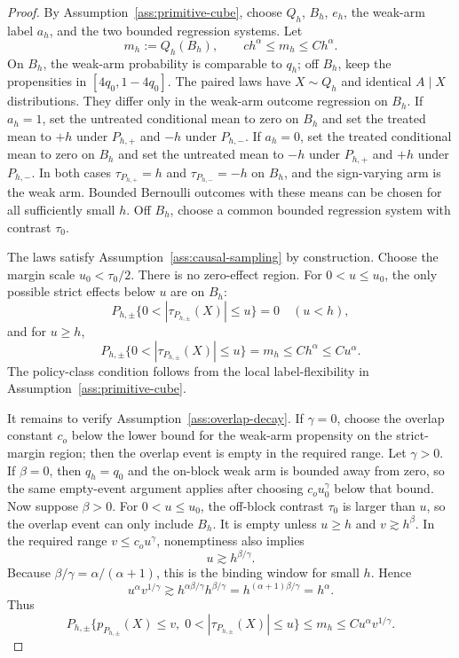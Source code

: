 \documentclass[11pt]{article}
\theoremstyle{definition}
\theoremstyle{plain}
\theoremstyle{remark}
\begin{document}
\begin{proof}
By Assumption~\ref{ass:primitive-cube}, choose \(Q_h\), \(B_h\),
\(e_h\), the weak-arm label \(a_h\), and the two bounded regression
systems.  Let
\[
m_h:=Q_h(B_h),\qquad c h^\alpha\le m_h\le C h^\alpha.
\]
On \(B_h\), the weak-arm probability is comparable to \(q_h\); off
\(B_h\), keep the propensities in \([4q_0,1-4q_0]\).  The paired laws have
\(X\sim Q_h\) and identical \(A\mid X\) distributions.  They differ only in
the weak-arm outcome regression on \(B_h\).  If \(a_h=1\), set the untreated
conditional mean to zero on \(B_h\) and set the treated mean to \(+h\) under
\(P_{h,+}\) and \(-h\) under \(P_{h,-}\).  If \(a_h=0\), set the treated
conditional mean to zero on \(B_h\) and set the untreated mean to \(-h\)
under \(P_{h,+}\) and \(+h\) under \(P_{h,-}\).  In both cases
\(\tau_{P_{h,+}}=h\) and \(\tau_{P_{h,-}}=-h\) on \(B_h\), and the
sign-varying arm is the weak arm.  Bounded Bernoulli outcomes with these
means can be chosen for all sufficiently small \(h\).  Off \(B_h\), choose a
common bounded regression system with contrast \(\tau_0\).

The laws satisfy Assumption~\ref{ass:causal-sampling} by construction.
Choose the margin scale \(u_0<\tau_0/2\).  There is no zero-effect region.
For \(0<u\le u_0\), the only possible strict effects below \(u\) are on
\(B_h\):
\[
P_{h,\pm}\{0<|\tau_{P_{h,\pm}}(X)|\le u\}=0
\quad (u<h),
\]
and for \(u\ge h\),
\[
P_{h,\pm}\{0<|\tau_{P_{h,\pm}}(X)|\le u\}=m_h
\le C h^\alpha\le C u^\alpha.
\]
The policy-class condition follows from the local label-flexibility in
Assumption~\ref{ass:primitive-cube}.

It remains to verify Assumption~\ref{ass:overlap-decay}.  If \(\gamma=0\),
choose the overlap constant \(c_o\) below the lower bound for the weak-arm
propensity on the strict-margin region; then the overlap event is empty in
the required range.  Let \(\gamma>0\).  If \(\beta=0\), then \(q_h=q_0\) and
the on-block weak arm is bounded away from zero, so the same empty-event
argument applies after choosing \(c_o u_0^\gamma\) below that bound.  Now
suppose \(\beta>0\).  For \(0<u\le u_0\), the off-block contrast \(\tau_0\)
is larger than \(u\), so the overlap event can only include \(B_h\).  It is
empty unless \(u\ge h\) and \(v\gtrsim h^\beta\).  In the required range
\(v\le c_o u^\gamma\), nonemptiness also implies
\[
u\gtrsim h^{\beta/\gamma}.
\]
Because \(\beta/\gamma=\alpha/(\alpha+1)\), this is the binding window for
small \(h\).  Hence
\[
u^\alpha v^{1/\gamma}
\gtrsim h^{\alpha\beta/\gamma}h^{\beta/\gamma}
=h^{(\alpha+1)\beta/\gamma}
=h^\alpha.
\]
Thus
\[
P_{h,\pm}\{p_{P_{h,\pm}}(X)\le v,\;0<|\tau_{P_{h,\pm}}(X)|\le u\}
\le m_h
\le C u^\alpha v^{1/\gamma}.
\]


\end{proof}
\end{document}
